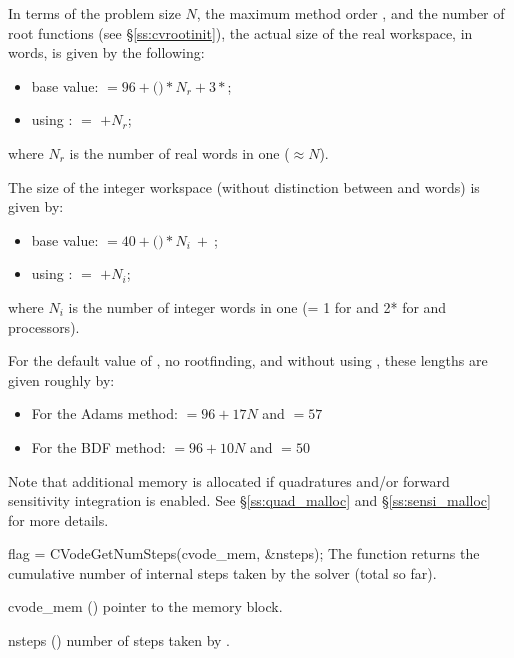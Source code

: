 {
  In terms of the problem size $N$, the maximum method order , and
  the number  of root functions (see \S\ref{ss:cvrootinit}),
  the actual size of the real workspace, in  words, is
  given by the following:
  \begin{itemize}
  \item base value:  $= 96 + ($$)*N_r + 3*$;
  \item using :  $=$  $+ N_r$;
  \end{itemize}
  where $N_r$ is the number of real words in one  ($\approx N$).

  The size of the integer workspace (without distinction between  
  and  words) is given by:
  \begin{itemize}
  \item base value:  $= 40 + ($$)*N_i ~ + ~ $;  
  \item using :  $=$  $+ N_i$;
  \end{itemize}
  where $N_i$ is the number of integer words in one 
  (= 1 for {\nvecs} and 2* for {\nvecp} and  processors).

  For the default value of , no rootfinding, and without
  using , these lengths are given roughly by:
  \begin{itemize}
  \item For the Adams method:  $= 96 + 17N$ and  $= 57$ 
  \item For the BDF method:  $= 96 + 10N$ and  $= 50$ 
  \end{itemize}

  Note that additional memory is allocated if quadratures and/or forward sensitivity
  integration is enabled. See \S\ref{ss:quad_malloc} and \S\ref{ss:sensi_malloc}
  for more details.
}
{
  flag = CVodeGetNumSteps(cvode\_mem, \&nsteps);
}
{
  The function  returns the cumulative number of internal 
  steps taken by the solver (total so far).
}
{
  \begin{args}
  \item[cvode\_mem] ()
    pointer to the {\cvodes} memory block.
  \item[nsteps] ()
    number of steps taken by {\cvodes}.
  \end{args}
}
